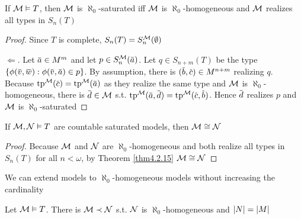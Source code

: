 \documentclass[11pt]{article}
\begin{document}
\begin{proposition}[]
\label{prop4.3.4}
If \(\mathcal{M}\vDash T\), then \(\mathcal{M}\) is \(\aleph_0\)-saturated iff \(\mathcal{M}\) is \(\aleph_0\)-homogeneous and \(\mathcal{M}\) realizes
all types in \(S_n(T)\)
\end{proposition}

\begin{proof}
Since \(T\) is complete, \(S_n(T)=S_n^{\mathcal{M}}(\emptyset)\)

\(\Leftarrow\). Let \(\bara\in M^m\) and let \(p\in S_n^{\calm}(\bara)\). Let \(q\in S_{n+m}(T)\) be the
type \(\{\phi(\barv,\barw):\phi(\barv,\bara)\in p\}\). By assumption, there is \((\barb,\barc)\in M^{n+m}\)
realizing \(q\). Because \(\tp^{\calm}(\barc)=\tp^{\calm}(\bara)\) as they realize the same type and \(\mathcal{M}\) is \(\aleph_0\)-homogeneous,
there is \(\bard\in\calm\) s.t. \(\tp^{\calm}(\bara,\bard)=\tp^{\calm}(\barc,\barb)\). Hence \(\bard\)
realizes \(p\) and \(\mathcal{M}\) is \(\aleph_0\)-saturated
\end{proof}

\begin{corollary}[]
\label{cor4.3.5}
If \(\mathcal{M},\mathcal{N}\vDash T\) are countable saturated models, then \(\mathcal{M}\cong\mathcal{N}\)
\end{corollary}

\begin{proof}
Because \(\mathcal{M}\) and \(\mathcal{N}\) are \(\aleph_0\)-homogeneous and both realize all types in \(S_n(T)\) for
all \(n<\omega\), by Theorem \ref{thm4.2.15} \(\mathcal{M}\cong\mathcal{N}\)
\end{proof}

We can extend models to \(\aleph_0\)-homogeneous models without increasing the cardinality

\begin{proposition}[]
\label{prop4.3.6}
Let \(\mathcal{M}\vDash T\). There is \(\mathcal{M}\prec\mathcal{N}\) s.t. \(\mathcal{N}\) is \(\aleph_0\)-homogeneous and \(\abs{N}=\abs{M}\)
\end{proposition}
\end{document}
